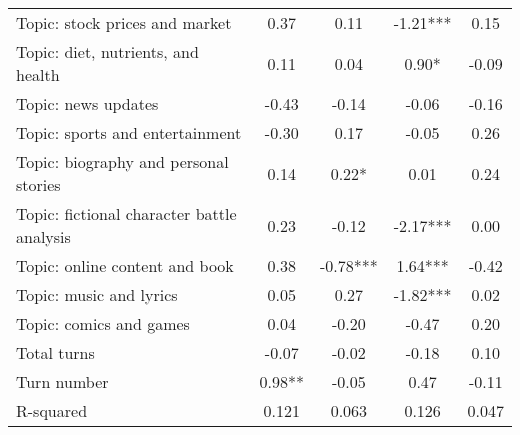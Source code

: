 \begin{table}[htbp]
\begin{tabular}{p{4cm}cccc}
Topic: stock prices and market & 0.37 & 0.11 & -1.21*** & 0.15 \\
Topic: diet, nutrients, and health & 0.11 & 0.04 & 0.90* & -0.09 \\
Topic: news updates & -0.43 & -0.14 & -0.06 & -0.16 \\
Topic: sports and entertainment & -0.30 & 0.17 & -0.05 & 0.26 \\
Topic: biography and personal stories & 0.14 & 0.22* & 0.01 & 0.24 \\
Topic: fictional character battle analysis & 0.23 & -0.12 & -2.17*** & 0.00 \\
Topic: online content and book & 0.38 & -0.78*** & 1.64*** & -0.42 \\
Topic: music and lyrics & 0.05 & 0.27 & -1.82*** & 0.02 \\
Topic: comics and games & 0.04 & -0.20 & -0.47 & 0.20 \\
Total turns & -0.07 & -0.02 & -0.18 & 0.10 \\
Turn number & 0.98** & -0.05 & 0.47 & -0.11 \\
\midrule
R-squared & 0.121 & 0.063 & 0.126 & 0.047 \\
\bottomrule
\end{tabular}
\end{table}